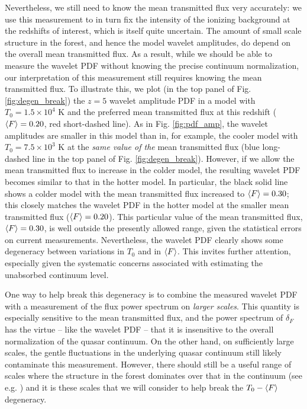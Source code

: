 Nevertheless, we still need to know the mean transmitted flux very accurately: we use this measurement to in turn fix the 
intensity of the ionizing background at the redshifts of interest, which is itself quite uncertain. The amount of small
scale structure in the forest, and hence the model wavelet amplitudes, do depend on the overall mean transmitted flux. As a result,
while we should be able to measure the wavelet PDF without knowing the precise continuum normalization, our interpretation
of this measurement still requires knowing the mean transmitted flux.
To illustrate
this, we plot (in the top panel of Fig. \ref{fig:degen_break}) the $z=5$ wavelet amplitude PDF in a model with $T_0 = 1.5 \times 10^4$ K
and the preferred mean transmitted flux at this redshift ($\langle F \rangle=0.20$, red short-dashed line). As in Fig.  \ref{fig:pdf_amp},
the wavelet amplitudes are smaller in this model than in, for example, the cooler model with $T_0 = 7.5 \times 10^3$ K at the {\em same value of the} mean transmitted flux (blue long-dashed line in the top panel of Fig. \ref{fig:degen_break}). However, if we allow
the mean transmitted flux to increase in the colder model, the resulting wavelet PDF becomes similar to that in the hotter model. 
In particular, the black solid line shows a colder model with the mean transmitted flux increased to $\langle F \rangle=0.30$; this
closely matches the wavelet PDF in the hotter model at the smaller mean transmitted flux ($\langle F \rangle=0.20$). This particular value 
of the mean transmitted
flux, $\langle F \rangle=0.30$, is well outside the presently allowed range, given 
the statistical errors on current measurements. Nevertheless, the wavelet PDF clearly shows
some degeneracy between variations in $T_0$ and in $\langle F \rangle$. This invites further attention, especially given the systematic
concerns associated with estimating the unabsorbed continuum level.

One way to help break this degeneracy is to combine the measured wavelet PDF with a measurement of
the flux power spectrum on {\em larger scales}. This quantity is especially sensitive to the
mean transmitted flux, and the power spectrum of $\delta_F$ has the virtue -- like the wavelet PDF --
that it is insensitive to the overall normalization of the quasar continuum. On the other hand, on sufficiently large
scales,  the gentle fluctuations in the underlying quasar continuum still likely contaminate this measurement. However, there
should still be a useful range of scales where the structure in the forest dominates over that in the continuum (see e.g. \citealt{McDonald:2004eu}) and it is
these scales that we will consider to help break the $T_0-\langle F \rangle$ degeneracy.
 
